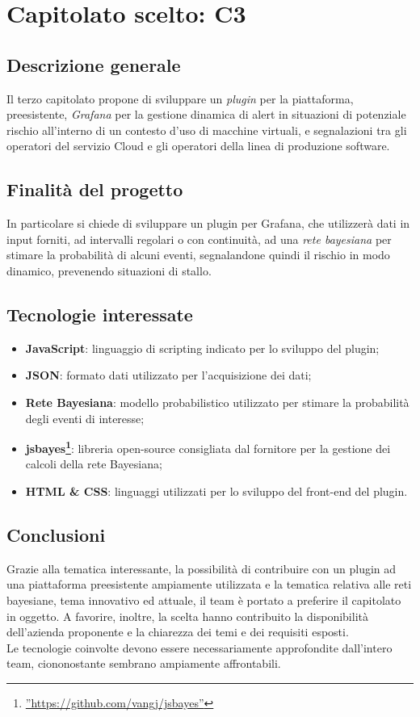 \section{Capitolato scelto: C3}

\subsection{Descrizione generale}
Il terzo capitolato propone di sviluppare un \textit{plugin} per la piattaforma, preesistente, \textit{Grafana} per la gestione dinamica di alert in situazioni di potenziale rischio all'interno di un contesto d'uso di macchine virtuali, e segnalazioni tra gli operatori del servizio Cloud e gli operatori della linea di produzione software.

\subsection{Finalità del progetto}
In particolare si chiede di sviluppare un plugin per Grafana, che utilizzerà dati in input forniti, ad intervalli regolari o con continuità, ad una \textit{rete bayesiana} per stimare la probabilità di alcuni eventi, segnalandone quindi il rischio in modo dinamico, prevenendo situazioni di stallo.

\subsection{Tecnologie interessate}
\begin{itemize}
	\item \textbf{JavaScript}: linguaggio di scripting indicato per lo sviluppo del plugin;
	\item \textbf{JSON}: formato dati utilizzato per l'acquisizione dei dati;
	\item \textbf{Rete Bayesiana}: modello probabilistico utilizzato per stimare la probabilità degli eventi di interesse;
	\item \textbf{jsbayes\footnote{\hyperref[Link al repository GitHub]{''https://github.com/vangj/jsbayes''}}}: libreria open-source consigliata dal fornitore per la gestione dei calcoli della rete Bayesiana;
	\item \textbf{HTML \& CSS}: linguaggi utilizzati per lo sviluppo del front-end del plugin.
\end{itemize}

\subsection{Conclusioni}
Grazie alla tematica interessante, la possibilità di contribuire con un plugin ad una piattaforma preesistente ampiamente utilizzata e la tematica relativa alle reti bayesiane, tema innovativo ed attuale, il team è portato a preferire il capitolato in oggetto. A favorire, inoltre, la scelta hanno contribuito la disponibilità dell'azienda proponente e la chiarezza dei temi e dei requisiti esposti.\\
Le tecnologie coinvolte devono essere necessariamente approfondite dall'intero team, ciononostante sembrano  ampiamente affrontabili.
